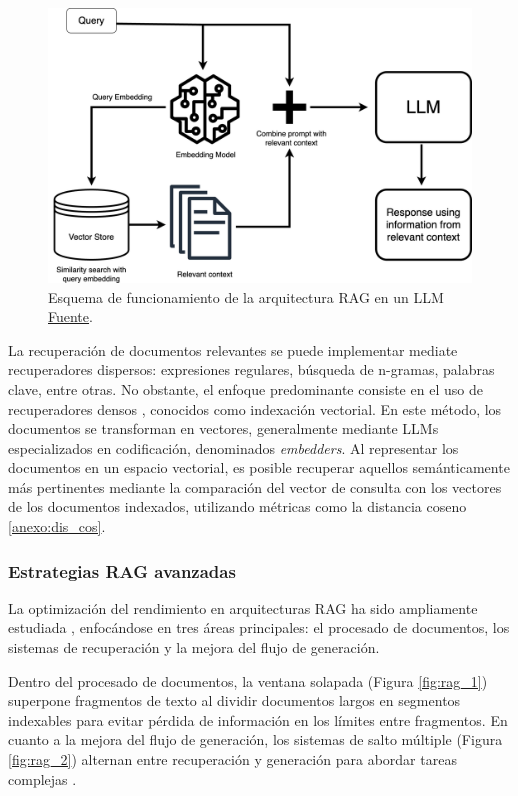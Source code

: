 \begin{figure}[hbtp]
  \centering
  \includegraphics[width=0.75\linewidth]{figures/RAG.png}
  \caption{Esquema de funcionamiento de la arquitectura RAG en un LLM \href{https://www.clarifai.com/blog/what-is-rag-retrieval-augmented-generation}{Fuente}.}
  \label{fig:rag}
\end{figure}

La recuperación de documentos relevantes se puede implementar mediate recuperadores dispersos: expresiones regulares, búsqueda de n-gramas, palabras clave, entre otras. No obstante, el enfoque predominante consiste en el uso de recuperadores densos \cite{gao_retrieval-augmented_2024}, conocidos como indexación vectorial. En este método, los documentos se transforman en vectores, generalmente mediante LLMs especializados en codificación, denominados \textit{embedders}. Al representar los documentos en un espacio vectorial, es posible recuperar aquellos semánticamente más pertinentes mediante la comparación del vector de consulta con los vectores de los documentos indexados, utilizando métricas como la distancia coseno \ref{anexo:dis_cos}.

\subsubsection{Estrategias RAG avanzadas}
\label{sec:estr_rag}
La optimización del rendimiento en arquitecturas RAG ha sido ampliamente estudiada \cite{zhu_retrieving_2021, gao_retrieval-augmented_2024}, enfocándose en tres áreas principales: el procesado de documentos, los sistemas de recuperación y la mejora del flujo de generación.

Dentro del procesado de documentos, la ventana solapada (Figura \ref{fig:rag_1}) superpone fragmentos de texto al dividir documentos largos en segmentos indexables para evitar pérdida de información en los límites entre fragmentos. En cuanto a la mejora del flujo de generación, los sistemas de salto múltiple (Figura \ref{fig:rag_2}) alternan entre recuperación y generación para abordar tareas complejas \cite{khattab_demonstrate-search-predict_2023, shao_enhancing_2023, qi_answering_2021, zheng_take_2024, trivedi_interleaving_2023}.

